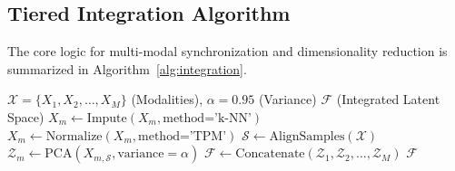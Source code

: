 \subsection{Tiered Integration Algorithm}
The core logic for multi-modal synchronization and dimensionality reduction is summarized in Algorithm~\ref{alg:integration}.

\begin{algorithm}[h]
\caption{Tiered Multi-Omics Integration}\label{alg:integration}
\begin{algorithmic}[1]
\REQUIRE $\mathcal{X} = \{X_1, X_2, \dots, X_M\}$ (Modalities), $\alpha = 0.95$ (Variance)
\ENSURE $\mathcal{F}$ (Integrated Latent Space)
    \STATE $X_m \gets \text{Impute}(X_m, \text{method='k-NN'})$
    \STATE $X_m \gets \text{Normalize}(X_m, \text{method='TPM'})$
\ENDFOR
\STATE $\mathcal{S} \gets \text{AlignSamples}(\mathcal{X})$
    \STATE $\mathcal{Z}_m \gets \text{PCA}(X_{m, \mathcal{S}}, \text{variance}=\alpha)$
\ENDFOR
\STATE $\mathcal{F} \gets \text{Concatenate}(\mathcal{Z}_1, \mathcal{Z}_2, \dots, \mathcal{Z}_M)$
\RETURN $\mathcal{F}$
\end{algorithmic}
\end{algorithm}
